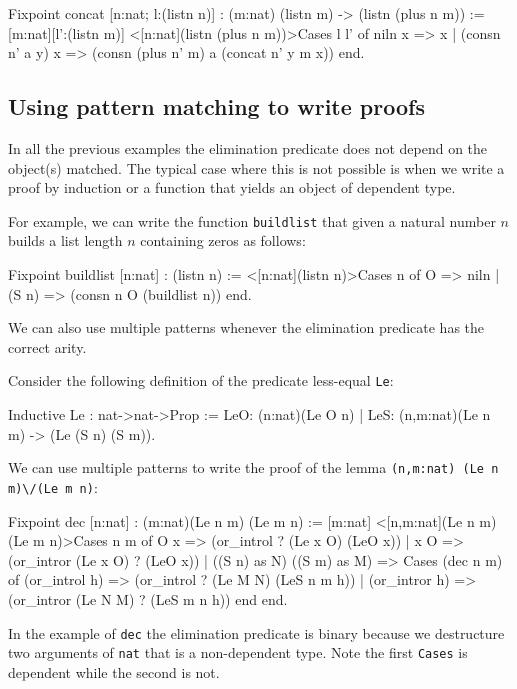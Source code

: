 \begin{coq_example}
Fixpoint concat [n:nat; l:(listn n)] : (m:nat) (listn m) -> (listn (plus n m)) := 
[m:nat][l':(listn m)] 
     <[n:nat](listn (plus n m))>Cases l l' of 
                     niln          x => x
                  | (consn n' a y) x => (consn (plus n' m) a (concat n' y m x))
                  end.
\end{coq_example}


\subsection{Using pattern matching to write proofs}
In all the previous examples the  elimination predicate  does not depend on the object(s) matched. 
The typical case where this is not possible is when we write a proof by
induction or a function that yields an object of dependent type.

For example, we can write 
the function \verb+buildlist+ that given a natural number
$n$ builds a list length $n$ containing zeros as follows:

\begin{coq_example}
Fixpoint buildlist [n:nat] : (listn n) :=
    <[n:nat](listn n)>Cases n of 
           O    => niln 
       |  (S n) => (consn n O (buildlist n))
       end.
\end{coq_example}

We can also use multiple patterns whenever the elimination predicate has
the correct arity. 

Consider the following definition of the predicate less-equal
\verb+Le+:

\begin{coq_example}
Inductive Le : nat->nat->Prop :=
  LeO: (n:nat)(Le O n)
| LeS: (n,m:nat)(Le n m) -> (Le (S n) (S m)).
\end{coq_example}

We can use multiple patterns to write  the proof of the lemma
 \verb+(n,m:nat) (Le n m)\/(Le m n)+:

\begin{coq_example}
Fixpoint dec  [n:nat] : (m:nat)(Le n m) \/ (Le m n) :=
 [m:nat] <[n,m:nat](Le n m) \/ (Le m n)>Cases n m of
           O   x =>  (or_introl ? (Le x O) (LeO x))
         | x   O =>  (or_intror (Le x O) ? (LeO x))
         | ((S n) as N) ((S m) as M) =>
              Cases (dec n m) of
                  (or_introl h) => (or_introl ? (Le M N) (LeS n m h))
               |  (or_intror h) => (or_intror (Le N M) ? (LeS m n h))
              end
        end.
\end{coq_example}
In the example of \verb+dec+ the elimination predicate is binary
because we destructure two arguments of \verb+nat+ that is a
non-dependent type. Note the first \verb+Cases+ is dependent while the
second  is not.

